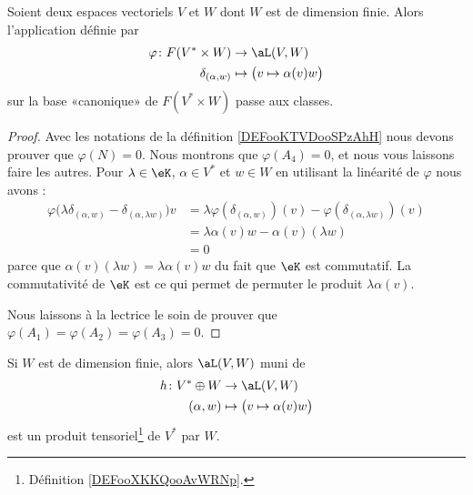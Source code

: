 \begin{lemma}       \label{LEMooOJEBooQruWEp}
	Soient deux espaces vectoriels \( V\) et \( W\) dont \( W\) est de dimension finie. Alors l'application définie par
	\begin{equation}
		\begin{aligned}
			\varphi\colon F(V^*\times W) & \to \aL(V,W)                            \\
			\delta_{(\alpha,w)}          & \mapsto \big( v\mapsto \alpha(v)w \big)
		\end{aligned}
	\end{equation}
	sur la base «canonique» de \( F(V^*\times W)\) passe aux classes.
\end{lemma}

\begin{proof}
	Avec les notations de la définition \ref{DEFooKTVDooSPzAhH} nous devons prouver que \( \varphi(N)=0\). Nous montrons que \( \varphi(A_4)=0\), et nous vous laissons faire les autres. Pour \( \lambda\in \eK\), \( \alpha\in V^*\) et \( w\in W\) en utilisant la linéarité de \( \varphi\) nous avons :
	\begin{subequations}
		\begin{align}
			\varphi\big( \lambda\delta_{(\alpha,w)}-\delta_{(\alpha,\lambda w)} \big)v & =\lambda\varphi(\delta_{(\alpha,w)})(v)-\varphi(\delta_{(\alpha,\lambda w)})(v) \\
			                                                                           & =\lambda\alpha(v)w-\alpha(v)(\lambda w)                                         \\
			                                                                           & =0
		\end{align}
	\end{subequations}
	parce que \( \alpha(v)(\lambda w)=\lambda \alpha(v)w\) du fait que \( \eK\) est commutatif. La commutativité de \( \eK\) est ce qui permet de permuter le produit \( \lambda \alpha(v)\).

	Nous laissons à la lectrice le soin de prouver que \( \varphi(A_1)=\varphi(A_2)=\varphi(A_3)=0\).
\end{proof}

\begin{lemma}       \label{LEMooUQZHooWjIGsy}
	Si \( W\) est de dimension finie, alors \( \aL(V,W)\) muni de
	\begin{equation}
		\begin{aligned}
			h\colon V^*\oplus W & \to \aL(V,W)                            \\
			(\alpha,w)          & \mapsto \big( v\mapsto \alpha(v)w \big)
		\end{aligned}
	\end{equation}
	est un produit tensoriel\footnote{Définition \ref{DEFooXKKQooAvWRNp}.} de \( V^*\) par \( W\).
\end{lemma}

